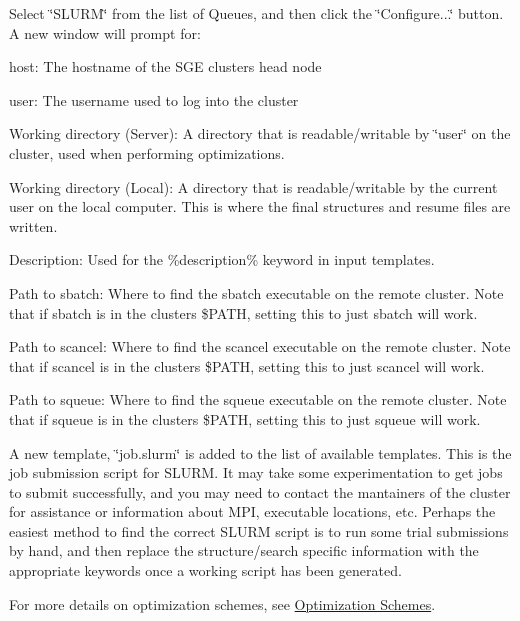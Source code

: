 Select \char`\"{}\+S\+L\+U\+R\+M\char`\"{} from the list of Queues, and then click the \char`\"{}\+Configure...\char`\"{} button. A new window will prompt for\+:
\begin{DoxyItemize}
\item host\+: The hostname of the S\+G\+E cluster\textquotesingle{}s head node
\item user\+: The username used to log into the cluster
\item Working directory (Server)\+: A directory that is readable/writable by \char`\"{}user\char`\"{} on the cluster, used when performing optimizations.
\item Working directory (Local)\+: A directory that is readable/writable by the current user on the local computer. This is where the final structures and resume files are written.
\item Description\+: Used for the \%description\% keyword in input templates.
\item Path to sbatch\+: Where to find the sbatch executable on the remote cluster. Note that if sbatch is in the cluster\textquotesingle{}s \$\+P\+A\+T\+H, setting this to just \textquotesingle{}sbatch\textquotesingle{} will work.
\item Path to scancel\+: Where to find the scancel executable on the remote cluster. Note that if scancel is in the cluster\textquotesingle{}s \$\+P\+A\+T\+H, setting this to just \textquotesingle{}scancel\textquotesingle{} will work.
\item Path to squeue\+: Where to find the squeue executable on the remote cluster. Note that if squeue is in the cluster\textquotesingle{}s \$\+P\+A\+T\+H, setting this to just \textquotesingle{}squeue\textquotesingle{} will work.
\end{DoxyItemize}

A new template, \char`\"{}job.\+slurm\char`\"{} is added to the list of available templates. This is the job submission script for S\+L\+U\+R\+M. It may take some experimentation to get jobs to submit successfully, and you may need to contact the mantainers of the cluster for assistance or information about M\+P\+I, executable locations, etc. Perhaps the easiest method to find the correct S\+L\+U\+R\+M script is to run some trial submissions by hand, and then replace the structure/search specific information with the appropriate keywords once a working script has been generated.

For more details on optimization schemes, see \hyperlink{optschemes}{Optimization Schemes}.

